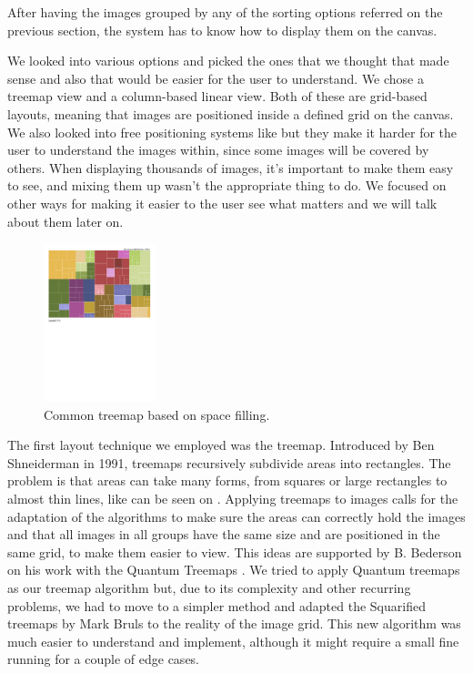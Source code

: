 After having the images grouped by any of the sorting options referred on the previous section, the system has to know how to display them on the canvas.

We looked into various options  and picked the ones that we thought that made sense and also that would be easier for the user to understand. We chose a treemap view and a column-based linear view. Both of these are grid-based layouts, meaning that images are positioned inside a defined grid on the canvas. We also looked into free positioning systems like  but they make it harder for the user to understand the images within, since some images will be covered by others. When displaying thousands of images, it's important to make them easy to see, and mixing them up wasn't the appropriate thing to do. We focused on other ways for making it easier to the user see what matters and we will talk about them later on.

\begin{figure}
	\vspace{-23pt}
	\begin{center}
		\includegraphics[width=0.29\textwidth]{Figures/Protovis-treemap.pdf}
	\end{center}
	\vspace{-20pt}
	\caption{Common treemap based on space filling.}
	\vspace{-5pt}
	\label{fig:commontreemap}
\end{figure}

The first layout technique we employed was the treemap. Introduced by Ben Shneiderman in 1991, treemaps recursively subdivide areas into rectangles. The problem is that areas can take many forms, from squares or large rectangles to almost thin lines, like can be seen on . Applying treemaps to images calls for the adaptation of the algorithms to make sure the areas can correctly hold the images and that all images in all groups have the same size and are positioned in the same grid, to make them easier to view. This ideas are supported by B. Bederson on his work with the Quantum Treemaps \cite{Bederson:2001:PZI:502348.502359}. We tried to apply Quantum treemaps as our treemap algorithm but, due to its complexity and other recurring problems, we had to move to a simpler method and adapted the Squarified treemaps \cite{Bruls:2000p3517} by Mark Bruls to the reality of the image grid. This new algorithm was much easier to understand and implement, although it might require a small fine running for a couple of edge cases.

